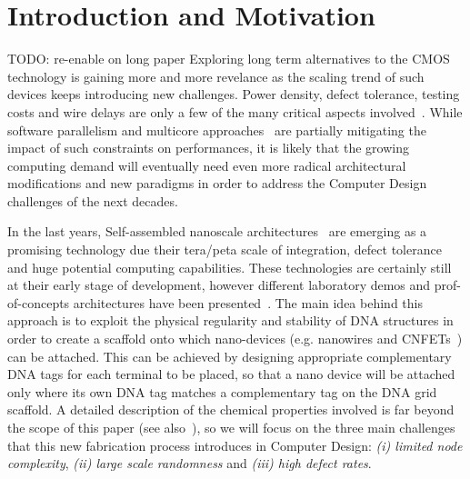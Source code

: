 
\section{Introduction and Motivation}

 TODO: re-enable on long paper
Exploring long term alternatives to the CMOS technology is gaining
more and more revelance as the scaling trend of such devices keeps
introducing new challenges. Power density, defect tolerance, testing
costs and wire delays are only a few of the many critical aspects
involved~\cite{itrs12}. While software parallelism and multicore
approaches~\cite{horowitz2004, mudge2001, powell2009} are partially mitigating the impact of such
constraints on performances, it is likely that the growing computing demand will
eventually need even more radical architectural modifications and new
paradigms in order to address the Computer Design challenges of the next
decades.

In the last years, Self-assembled nanoscale architectures~\cite{winfree1998, yan2003}
are emerging as a promising technology due their tera/peta scale of
integration, defect tolerance and huge potential computing
capabilities. These technologies are certainly still at
their early stage of development, however different laboratory demos and
prof-of-concepts architectures have been presented~\cite{patwardhan2004, patwardhan2006_1, pistol2009}.
The main idea behind this approach is to exploit the physical regularity and
stability of DNA structures in order to create a scaffold onto which
nano-devices (e.g. nanowires and CNFETs~\cite{bachtold2001, tans1998, cui2001}) can be
attached. This can be achieved by designing appropriate complementary DNA tags for
each terminal to be placed, so that a nano device will be attached
only where its own DNA tag matches a complementary tag on the DNA grid
scaffold.
A detailed description of the chemical properties involved is far
beyond the scope of this paper (see also~\cite{braun1998, seeman1999}), so we will focus on
the three main challenges that this new fabrication process introduces
in Computer Design: \emph{(i) limited node complexity}, \emph{(ii) large scale
randomness} and \emph{(iii) high defect rates}.  

